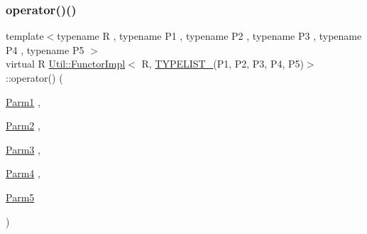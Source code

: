 \subsubsection{\texorpdfstring{operator()()}{operator()()}\hspace{0.1cm}{\footnotesize\ttfamily [2/3]}}
{\footnotesize\ttfamily template$<$typename R , typename P1 , typename P2 , typename P3 , typename P4 , typename P5 $>$ \\
virtual R \mbox{\hyperlink{classUtil_1_1FunctorImpl}{Util\+::\+Functor\+Impl}}$<$ R, \mbox{\hyperlink{adat__devel__install_2include_2adat_2typelist_8h_aad5d9b3c82c8503c85c625acd41c0a2f}{T\+Y\+P\+E\+L\+I\+S\+T\+\_}}(P1, P2, P3, P4, P5)$>$\+::operator() (\begin{DoxyParamCaption}\item[{\mbox{\hyperlink{structUtil_1_1Private_1_1FunctorImplBase_a9d61e693d6c616dea5bd9d9073c7d21a}{Parm1}}}]{,  }\item[{\mbox{\hyperlink{structUtil_1_1Private_1_1FunctorImplBase_a554085cd798ef14838a59b528f0feb2e}{Parm2}}}]{,  }\item[{\mbox{\hyperlink{structUtil_1_1Private_1_1FunctorImplBase_a052148e627fd4caecbcffdbdf1033dbb}{Parm3}}}]{,  }\item[{\mbox{\hyperlink{structUtil_1_1Private_1_1FunctorImplBase_a1ad7fe3f243480c44a610927ebe76762}{Parm4}}}]{,  }\item[{\mbox{\hyperlink{structUtil_1_1Private_1_1FunctorImplBase_ac5b1d132e854e4f9fd6fb1e43313fa26}{Parm5}}}]{ }\end{DoxyParamCaption})\hspace{0.3cm}{\ttfamily [pure virtual]}}

\mbox{\label{classUtil_1_1FunctorImpl_3_01R_00_01TYPELIST__5_07P1_00_01P2_00_01P3_00_01P4_00_01P5_08_4_afa0289015b075748033bab4939b8ecbb}} 
